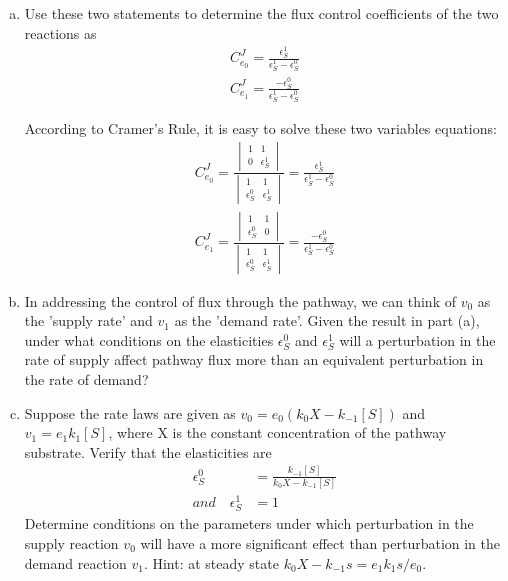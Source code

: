\documentclass[paper=a4, fontsize=11pt]{scrartcl} %
\numberwithin{equation}{section} %
\numberwithin{figure}{section} %
\numberwithin{table}{section} %
\begin{document}
	\begin{enumerate}[a)]
		\item Use these two statements to determine the flux control coefficients of the two reactions as
		\begin{align*}
			C_{e_0}^J=\frac{\epsilon_S^1}{\epsilon_S^1-\epsilon_S^0}\\
			C_{e_1}^J=\frac{-\epsilon_S^0}{\epsilon_S^1-\epsilon_S^0}
		\end{align*}

		According to Cramer's Rule, it is easy to solve these two variables equations:
		\begin{align*}
			C_{e_0}^J=\frac{
				\begin{vmatrix}
					1 & 1  \\
   					0 & \epsilon_S^1
				\end{vmatrix}
			}{
				\begin{vmatrix}
					1 & 1  \\
   					\epsilon_S^0 & \epsilon_S^1
				\end{vmatrix}
			}=\frac{\epsilon_S^1}{\epsilon_S^1-\epsilon_S^0}\\
			C_{e_1}^J=\frac{
				\begin{vmatrix}
					1 & 1  \\
   					\epsilon_S^0 & 0
				\end{vmatrix}
			}{
				\begin{vmatrix}
					1 & 1  \\
   					\epsilon_S^0 & \epsilon_S^1
				\end{vmatrix}
			}=\frac{-\epsilon_S^0}{\epsilon_S^1-\epsilon_S^0}
		\end{align*}

		\item In addressing the control of flux through the pathway, we can think of $v_0$ as the 'supply rate' and $v_1$ as the 'demand rate'. Given the result in part (a), under what conditions on the elasticities $\epsilon_S^0$ and $\epsilon_S^1$ will a perturbation in the rate of supply affect pathway flux more than an equivalent perturbation in the rate of demand?



		\item Suppose the rate laws are given as $v_0 = e_0(k_0X - k_{-1}[S])$ and $v_1 = e_1k_1[S]$, where X is the constant concentration of the pathway substrate. Verify that the elasticities are
		\begin{align*}
			\epsilon_S^0 &= \frac{k_{-1}[S]}{k_0X-k_{-1}[S]}\\
			and \quad \epsilon_S^1 &= 1
		\end{align*}
		Determine conditions on the parameters under which perturbation in the supply reaction $v_0$ will have a more significant effect than perturbation in the demand reaction $v_1$. Hint: at steady state $k_0X-k_{-1}s = e_1k_1s/e_0$.


\end{enumerate}
\end{document}
